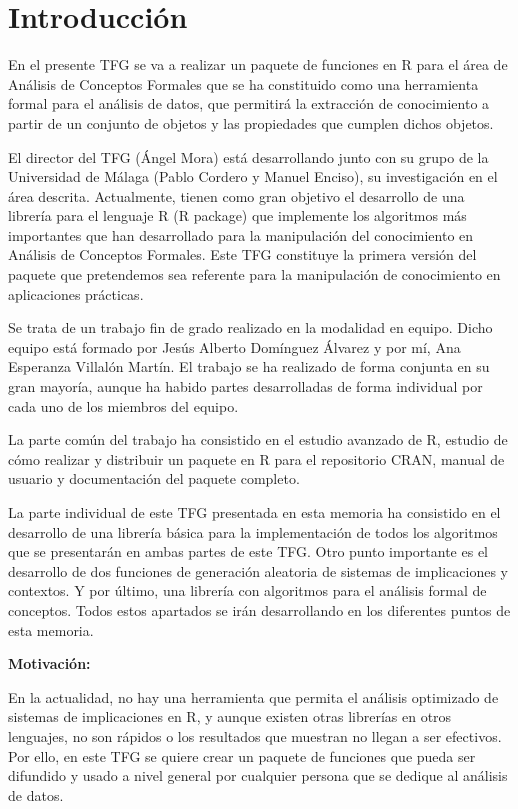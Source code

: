 \section{Introducci\'on}

En el presente TFG se va a realizar un paquete de funciones en 
R para el \'area de An\'alisis de Conceptos Formales que se ha 
constituido como una herramienta formal para el an\'alisis de datos, 
que permitir\'a la extracci\'on de conocimiento a partir de un 
conjunto de objetos y las propiedades que cumplen dichos objetos.

El director del TFG (\'Angel Mora) est\'a desarrollando junto 
con su grupo de la Universidad de M\'alaga (Pablo Cordero y Manuel 
Enciso), su investigaci\'on en el \'area descrita. Actualmente, 
tienen como gran objetivo el desarrollo de una librer\'ia para el 
lenguaje R (R package) que implemente los algoritmos m\'as 
importantes que han desarrollado para la manipulaci\'on del 
conocimiento en An\'alisis de Conceptos Formales. Este TFG 
constituye la primera versi\'on del paquete que pretendemos sea 
referente para la manipulaci\'on de conocimiento en aplicaciones 
pr\'acticas.

Se trata de un trabajo fin de grado realizado en la modalidad en equipo. 
Dicho equipo est\'a formado por Jes\'us Alberto Dom\'inguez \'Alvarez y por m\'i, 
Ana Esperanza Villal\'on Mart\'in. El trabajo se ha realizado de forma conjunta en su 
gran mayor\'ia, aunque ha habido partes desarrolladas de forma individual por cada uno 
de los miembros del equipo.

La parte com\'un del trabajo ha consistido en el estudio avanzado de R, estudio de c\'omo 
realizar y distribuir un paquete en R para el repositorio CRAN, manual de usuario y documentaci\'on del 
paquete completo.

La parte individual de este TFG presentada en esta memoria ha consistido en el desarrollo de una librer\'ia b\'asica 
para la implementaci\'on de todos los algoritmos que se presentar\'an en ambas partes de este TFG. Otro punto importante es 
el desarrollo de dos funciones de generaci\'on aleatoria de sistemas de implicaciones y contextos. Y por \'ultimo, una librer\'ia 
con algoritmos para el an\'alisis formal de conceptos. Todos estos apartados se ir\'an desarrollando en los diferentes puntos de esta memoria.

\clearpage

\textbf{Motivaci\'on:}

En la actualidad, no hay una herramienta que permita el an\'alisis 
optimizado de sistemas de implicaciones en R, y aunque existen otras 
librer\'ias en otros lenguajes, no son r\'apidos o los resultados que 
muestran no llegan a ser efectivos.
Por ello, en este TFG se quiere crear un paquete de funciones que pueda 
ser difundido y usado a nivel general por cualquier persona que se dedique 
al an\'alisis de datos.
\\
\\


